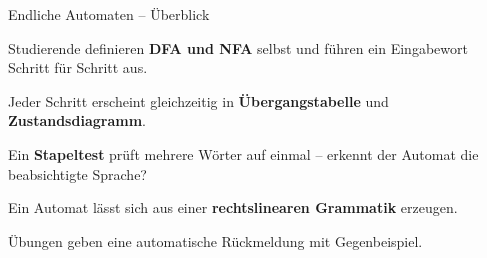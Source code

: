 %
%
%


\begin{itemframe}{Endliche Automaten -- Überblick}
  \item Studierende definieren \textbf{DFA und NFA} selbst und führen ein Eingabewort Schritt für Schritt aus.
  \item Jeder Schritt erscheint gleichzeitig in \textbf{Übergangstabelle} und \textbf{Zustandsdiagramm}.
  \item Ein \textbf{Stapeltest} prüft mehrere Wörter auf einmal -- erkennt der Automat die beabsichtigte Sprache?
  \item Ein Automat lässt sich aus einer \textbf{rechtslinearen Grammatik} erzeugen.
  \item Übungen geben eine automatische Rückmeldung mit Gegenbeispiel.
\end{itemframe}

